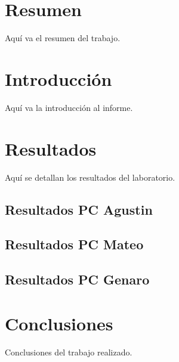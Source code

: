 \documentclass[a4paper,12pt]{article}
\begin{document}


\section*{Resumen}
Aquí va el resumen del trabajo.

\section*{Introducción}
Aquí va la introducción al informe.

\section*{Resultados}
Aquí se detallan los resultados del laboratorio.

\subsection{Resultados PC Agustin}


\subsection{Resultados PC Mateo}


\subsection{Resultados PC Genaro}



\section*{Conclusiones}
Conclusiones del trabajo realizado.
\end{document}

